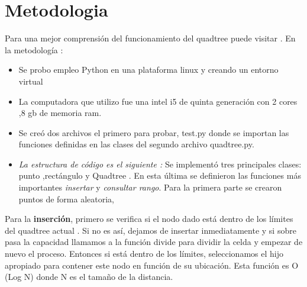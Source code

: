 \section{Metodologia}

  
Para una mejor comprensión del funcionamiento del quadtree puede visitar \cite{pagina}.
En la metodología :     

 \begin{itemize}
     \item Se probo empleo Python en una plataforma linux y creando un entorno virtual \cite{video}
     \item  La computadora  que utilizo fue una intel i5 de quinta generación  con 2 cores ,8 gb  de memoria ram.
     \item  Se creó dos archivos el primero para probar,  test.py donde se importan las funciones definidas en  las clases   del segundo archivo quadtree.py.
     
     \item \textit{La estructura de código es el siguiente :}
Se implementó   tres principales clases: punto ,rectángulo y Quadtree \cite{quadtreepage}.
En esta última se definieron las funciones más importantes  \textit{insertar} y \textit{consultar rango}.
Para la primera parte  se crearon puntos de forma aleatoria,


     
 \end{itemize}
 
Para la \textbf{inserción}, primero se  verifica si el nodo dado está dentro de los límites del quadtree actual . Si no es así, dejamos de insertar inmediatamente y si sobre pasa la capacidad llamamos a la función divide para dividir la celda y empezar de nuevo el proceso. Entonces si está dentro de los límites, seleccionamos el hijo apropiado para contener este nodo en función de su ubicación.
Esta función es O (Log N) donde N es el tamaño de la distancia.
 








